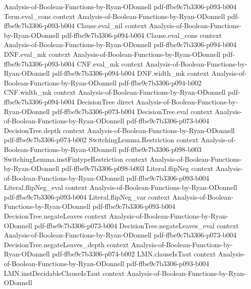\begin{lemma}
  {Analysis-of-Boolean-Functions-by-Ryan-ODonnell}
  {pdf-ffbe9c7b3306-p093-b004}
\proofstep
  {Term.eval_cons}
  {context}
  {Analysis-of-Boolean-Functions-by-Ryan-ODonnell}
  {pdf-ffbe9c7b3306-p093-b004}
\proofstep
  {Clause.eval_nil}
  {context}
  {Analysis-of-Boolean-Functions-by-Ryan-ODonnell}
  {pdf-ffbe9c7b3306-p094-b004}
\proofstep
  {Clause.eval_cons}
  {context}
  {Analysis-of-Boolean-Functions-by-Ryan-ODonnell}
  {pdf-ffbe9c7b3306-p094-b004}
\proofstep
  {DNF.eval_mk}
  {context}
  {Analysis-of-Boolean-Functions-by-Ryan-ODonnell}
  {pdf-ffbe9c7b3306-p093-b004}
\proofstep
  {CNF.eval_mk}
  {context}
  {Analysis-of-Boolean-Functions-by-Ryan-ODonnell}
  {pdf-ffbe9c7b3306-p094-b004}
\proofstep
  {DNF.width_mk}
  {context}
  {Analysis-of-Boolean-Functions-by-Ryan-ODonnell}
  {pdf-ffbe9c7b3306-p094-b002}
\proofstep
  {CNF.width_mk}
  {context}
  {Analysis-of-Boolean-Functions-by-Ryan-ODonnell}
  {pdf-ffbe9c7b3306-p094-b004}
\proofstep
  {DecisionTree}
  {direct}
  {Analysis-of-Boolean-Functions-by-Ryan-ODonnell}
  {pdf-ffbe9c7b3306-p073-b004}
\proofstep
  {DecisionTree.eval}
  {context}
  {Analysis-of-Boolean-Functions-by-Ryan-ODonnell}
  {pdf-ffbe9c7b3306-p073-b004}
\proofstep
  {DecisionTree.depth}
  {context}
  {Analysis-of-Boolean-Functions-by-Ryan-ODonnell}
  {pdf-ffbe9c7b3306-p074-b002}
\proofstep
  {SwitchingLemma.Restriction}
  {context}
  {Analysis-of-Boolean-Functions-by-Ryan-ODonnell}
  {pdf-ffbe9c7b3306-p098-b003}
\proofstep
  {SwitchingLemma.instFintypeRestriction}
  {context}
  {Analysis-of-Boolean-Functions-by-Ryan-ODonnell}
  {pdf-ffbe9c7b3306-p098-b003}
\proofstep
  {Literal.flipNeg}
  {context}
  {Analysis-of-Boolean-Functions-by-Ryan-ODonnell}
  {pdf-ffbe9c7b3306-p093-b004}
\proofstep
  {Literal.flipNeg_eval}
  {context}
  {Analysis-of-Boolean-Functions-by-Ryan-ODonnell}
  {pdf-ffbe9c7b3306-p093-b004}
\proofstep
  {Literal.flipNeg_var}
  {context}
  {Analysis-of-Boolean-Functions-by-Ryan-ODonnell}
  {pdf-ffbe9c7b3306-p093-b004}
\proofstep
  {DecisionTree.negateLeaves}
  {context}
  {Analysis-of-Boolean-Functions-by-Ryan-ODonnell}
  {pdf-ffbe9c7b3306-p073-b004}
\proofstep
  {DecisionTree.negateLeaves_eval}
  {context}
  {Analysis-of-Boolean-Functions-by-Ryan-ODonnell}
  {pdf-ffbe9c7b3306-p073-b004}
\proofstep
  {DecisionTree.negateLeaves_depth}
  {context}
  {Analysis-of-Boolean-Functions-by-Ryan-ODonnell}
  {pdf-ffbe9c7b3306-p074-b002}
\proofstep
  {LMN.clauseIsTaut}
  {context}
  {Analysis-of-Boolean-Functions-by-Ryan-ODonnell}
  {pdf-ffbe9c7b3306-p093-b004}
\proofstep
  {LMN.instDecidableClauseIsTaut}
  {context}
  {Analysis-of-Boolean-Functions-by-Ryan-ODonnell}

\end{lemma}
